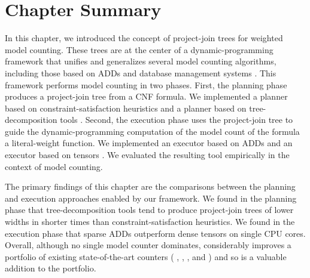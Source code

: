 \section{Chapter Summary}
\label{sec_discussion}

In this chapter, we introduced the concept of project-join trees for weighted model counting.
These trees are at the center of a dynamic-programming framework that unifies and generalizes several model counting algorithms, including those based on ADDs \cite{DPV20} and database management systems \cite{fichte2020exploiting}.
This framework performs model counting in two phases.
First, the planning phase produces a project-join tree from a CNF formula.
We implemented a planner \Htb{} based on constraint-satisfaction heuristics
\cite{tarjan1984simple,koster2001treewidth,dechter03,dechter99,bouquet1999gestion}
and a planner \Lg{} based on tree-decomposition tools \cite{strasser2017computing,Tamaki17,AMW17}.
Second, the execution phase uses the project-join tree to guide the dynamic-programming computation of the model count of the formula \wrt{} a literal-weight function.
We implemented an executor \Dmc{} based on ADDs \cite{DPV20,somenzi2015cudd} and an executor \Tensor{} based on tensors \cite{numpy}.
We evaluated the resulting tool \Dpmc{} empirically in the context of model counting.

The primary findings of this chapter are the comparisons between the planning and execution approaches enabled by our framework.
We found in the planning phase that tree-decomposition tools tend to produce project-join trees of lower widths in shorter times than constraint-satisfaction heuristics.
We found in the execution phase that sparse ADDs outperform dense tensors on single CPU cores.
Overall, although no single model counter dominates, \Dpmc{} considerably improves a portfolio of existing state-of-the-art counters (\cachet{} \cite{sang2004combining}, \ctd{} \cite{darwiche2004new}, \df{} \cite{LM17}, and \minictd{} \cite{OD15}) and so is a valuable addition to the portfolio.
